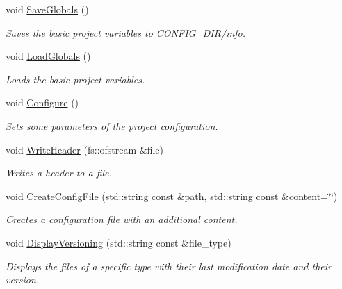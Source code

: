 \begin{DoxyCompactItemize}
\mbox{\label{namespacemlm_a91e9e79cd8ec64caf713377a900acec4}} 
void \mbox{\hyperlink{namespacemlm_a91e9e79cd8ec64caf713377a900acec4}{Save\+Globals}} ()
\begin{DoxyCompactList}\small\item\em Saves the basic project variables to C\+O\+N\+F\+I\+G\+\_\+\+D\+I\+R/info. \end{DoxyCompactList}\item 
\mbox{\label{namespacemlm_a794a567144331ef68a76bbffcaebb23e}} 
void \mbox{\hyperlink{namespacemlm_a794a567144331ef68a76bbffcaebb23e}{Load\+Globals}} ()
\begin{DoxyCompactList}\small\item\em Loads the basic project variables. \end{DoxyCompactList}\item 
\mbox{\label{namespacemlm_a75a2f031d5730089651b2009b76f6b3d}} 
void \mbox{\hyperlink{namespacemlm_a75a2f031d5730089651b2009b76f6b3d}{Configure}} ()
\begin{DoxyCompactList}\small\item\em Sets some parameters of the project configuration. \end{DoxyCompactList}\item 
void \mbox{\hyperlink{namespacemlm_a2479e1311fac66b7c4040f8c95393195}{Write\+Header}} (fs\+::ofstream \&file)
\begin{DoxyCompactList}\small\item\em Writes a header to a file. \end{DoxyCompactList}\item 
void \mbox{\hyperlink{namespacemlm_a29b72028971c54b654ec2852fd95e1f9}{Create\+Config\+File}} (std\+::string const \&path, std\+::string const \&content=\char`\"{}\char`\"{})
\begin{DoxyCompactList}\small\item\em Creates a configuration file with an additional content. \end{DoxyCompactList}\item 
void \mbox{\hyperlink{namespacemlm_a8e849075a7b5be3a544f13d6330a4b07}{Display\+Versioning}} (std\+::string const \&file\+\_\+type)
\begin{DoxyCompactList}\small\item\em Displays the files of a specific type with their last modification date and their version. \end{DoxyCompactList}\item 

\end{DoxyCompactItemize}
